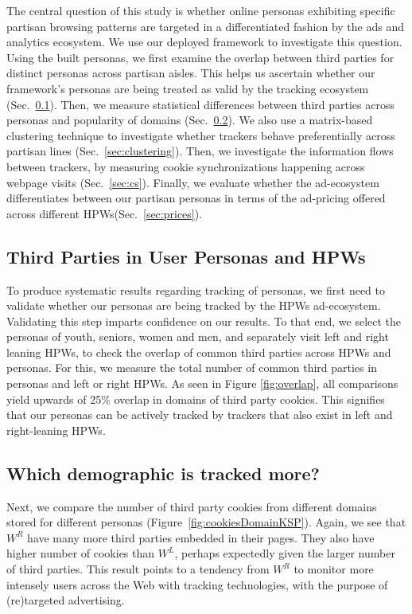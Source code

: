 \documentclass{article}
\newcommand{\hpws}{HPWs\xspace}
\begin{document}
The central question of this study is whether online personas exhibiting specific partisan browsing patterns are targeted in a differentiated fashion by the ads and analytics ecosystem.
We use our deployed framework to investigate this question.
Using the built personas, we first examine the overlap between third parties for distinct personas across partisan aisles.
This helps us ascertain whether our framework's personas are being treated as valid by the tracking ecosystem (Sec.~\ref{sec:overlap}).
Then, we measure statistical differences between third parties across personas and popularity of domains (Sec.~\ref{sec:more-cookies-demo}).
We also use a matrix-based clustering technique to investigate whether trackers behave preferentially across partisan lines (Sec.~\ref{sec:clustering}).
Then, we investigate the information flows between trackers, by measuring cookie synchronizations happening across webpage visits (Sec.~\ref{sec:cs}).
Finally, we evaluate whether the ad-ecosystem differentiates between our partisan personas in terms of the ad-pricing offered across different \hpws (Sec.~\ref{sec:prices}).



\subsection{Third Parties in User Personas and \hpws}
\label{sec:overlap}
To produce systematic results regarding tracking of personas, we first need to validate whether our personas are being tracked by the \hpws ad-ecosystem.
Validating this step imparts confidence on our results.
To that end, we select the personas of youth, seniors, women and men, and separately visit left and right leaning \hpws, to check the overlap of common third parties across \hpws and personas.
For this, we measure the total number of common third parties in personas and left or right \hpws.
As seen in Figure \ref{fig:overlap}, all comparisons yield upwards of 25\% overlap in domains of third party cookies.
This signifies that our personas can be actively tracked by trackers that also exist in left and right-leaning \hpws.


\subsection{Which demographic is tracked more?}\label{sec:more-cookies-demo}


Next, we compare the number of third party cookies from different domains stored for different personas (Figure~\ref{fig:cookiesDomainKSP}).
Again, we see that $W^R$ have many more third parties embedded in their pages.
They also have higher number of cookies than $W^L$, perhaps expectedly given the larger number of third parties.
This result points to a tendency from $W^R$ to monitor more intensely users across the Web with tracking technologies, with the purpose of (re)targeted advertising.
\end{document}
